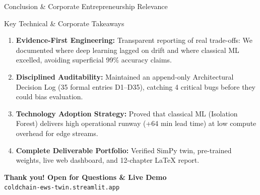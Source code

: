 \documentclass[aspectratio=169, 10pt]{beamer}
\begin{document}
\begin{frame}{Conclusion \& Corporate Entrepreneurship Relevance}
    \begin{block}{Key Technical \& Corporate Takeaways}
        \begin{enumerate}\small
            \item \textbf{Evidence-First Engineering:} Transparent reporting of real trade-offs: We documented where deep learning lagged on drift and where classical ML excelled, avoiding superficial 99\% accuracy claims.
            \item \textbf{Disciplined Auditability:} Maintained an append-only Architectural Decision Log (35 formal entries D1--D35), catching 4 critical bugs before they could bias evaluation.
            \item \textbf{Technology Adoption Strategy:} Proved that classical ML (Isolation Forest) delivers high operational runway (+64 min lead time) at low compute overhead for edge streams.
            \item \textbf{Complete Deliverable Portfolio:} Verified SimPy twin, pre-trained weights, live web dashboard, and 12-chapter LaTeX report.
        \end{enumerate}
    \end{block}
    \vspace{4pt}
    \begin{center}
        \textbf{\textcolor{NavyBlue}{\Large Thank you! Open for Questions \& Live Demo}}\\[3pt]
        \small\texttt{coldchain-ews-twin.streamlit.app}
    \end{center}
\end{frame}
\end{document}
